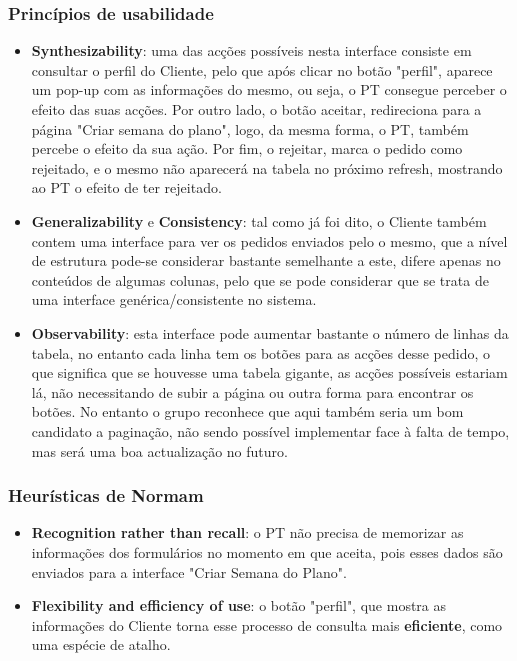 \subsubsection{Princípios de usabilidade}
\begin{itemize}
    \item \textbf{Synthesizability}: uma das acções possíveis nesta interface consiste em consultar o perfil do Cliente, pelo que após clicar no botão "perfil", aparece um pop-up com as informações do mesmo, ou seja, o PT consegue perceber o efeito das suas acções. Por outro lado, o botão aceitar, redireciona para a página "Criar semana do plano", logo, da mesma forma, o PT, também percebe o efeito da sua ação. Por fim, o rejeitar, marca o pedido como rejeitado, e o mesmo não aparecerá na tabela no próximo refresh, mostrando ao PT o efeito de ter rejeitado.
    \item \textbf{Generalizability} e \textbf{Consistency}: tal como já foi dito, o Cliente também contem uma interface para ver os pedidos enviados pelo o mesmo, que a nível de estrutura pode-se considerar bastante semelhante a este, difere apenas no conteúdos de algumas colunas, pelo que se pode considerar que se trata de uma interface genérica/consistente no sistema. 
    \item \textbf{Observability}: esta interface pode aumentar bastante o número de linhas da tabela, no entanto cada linha tem os botões para as acções desse pedido, o que significa que se houvesse uma tabela gigante, as acções possíveis estariam lá, não necessitando de subir a página ou outra forma para encontrar os botões. No entanto o grupo reconhece que aqui também seria um bom candidato a paginação, não sendo possível implementar face à falta de tempo, mas será uma boa actualização no futuro.
\end{itemize}

\subsubsection{Heurísticas de Normam}
\begin{itemize}
    \item \textbf{Recognition rather than recall}: o PT não precisa de memorizar as informações dos formulários no momento em que aceita, pois esses dados são enviados para a interface "Criar Semana do Plano".
    \item \textbf{Flexibility and efficiency of use}: o botão "perfil", que mostra as informações do Cliente torna esse processo de consulta mais \textbf{eficiente}, como uma espécie de atalho.
    
\end{itemize}

